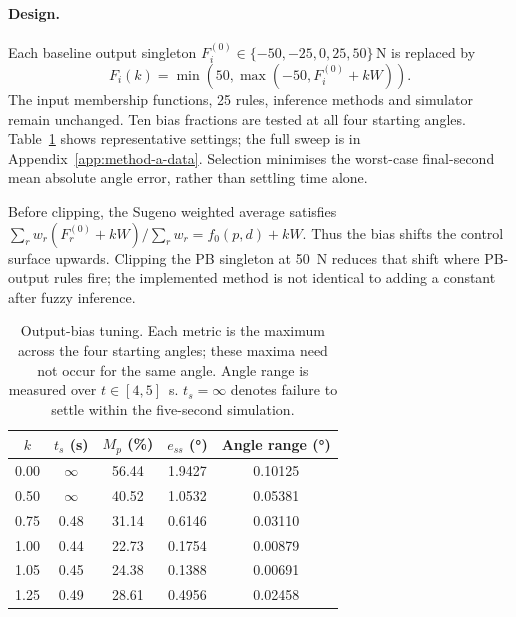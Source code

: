 \documentclass[11pt,a4paper]{article}
\newcommand{\ts}{\ensuremath{t_s}}
\newcommand{\overshoot}{\ensuremath{M_p}}
\newcommand{\sse}{\ensuremath{e_{ss}}}
\begin{document}
\paragraph{Design.}
Each baseline output singleton $F_i^{(0)}\in\{-50,-25,0,25,50\}\,\si{\N}$
is replaced by
\begin{equation}
  F_i(k)=\min\!\left(50,\max\!\left(-50,F_i^{(0)}+kW\right)\right).
  \label{eq:method-a-bias}
\end{equation}
The input membership functions, 25 rules, inference methods and simulator
remain unchanged. Ten bias fractions are tested at all four starting angles.
Table~\ref{tab:method-a} shows representative settings; the full sweep is in
Appendix~\ref{app:method-a-data}. Selection minimises the worst-case
final-second mean absolute angle error, rather than settling time alone.

Before clipping, the Sugeno weighted average satisfies
$\sum_r w_r(F_r^{(0)}+kW)/\sum_r w_r=f_0(p,d)+kW$.
Thus the bias shifts the control surface upwards. Clipping the PB singleton
at \SI{50}{\N} reduces that shift where PB-output rules fire; the implemented
method is not identical to adding a constant after fuzzy inference.

\begin{table}[H]
\centering
\small
\begin{tabular}{@{}ccccc@{}}
\toprule
$k$ & $\ts$ (\si{\s}) & $\overshoot$ (\si{\%}) & $\sse$ (\si{\degree}) & Angle range (\si{\degree}) \\
\midrule
0.00 & $\infty$ & 56.44 & 1.9427 & 0.10125 \\
0.50 & $\infty$ & 40.52 & 1.0532 & 0.05381 \\
0.75 & 0.48 & 31.14 & 0.6146 & 0.03110 \\
1.00 & 0.44 & 22.73 & 0.1754 & 0.00879 \\
1.05 & 0.45 & 24.38 & 0.1388 & 0.00691 \\
1.25 & 0.49 & 28.61 & 0.4956 & 0.02458 \\
\bottomrule
\end{tabular}
\caption{Output-bias tuning. Each metric is the maximum across the four
starting angles; these maxima need not occur for the same angle.
Angle range is measured over $t\in[4,5]$~\si{\s}.
$\ts=\infty$ denotes failure to settle within the five-second simulation.}
\label{tab:method-a}
\end{table}
\end{document}
